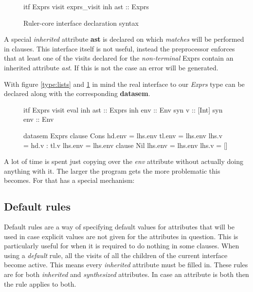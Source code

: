\begin{figure}[h!]
\begin{code}
itf Exprs
  visit exprs_visit
    inh ast :: Exprs
\end{code}
\caption{Ruler-core interface declaration syntax}
\label{itf:exprs}
\end{figure}

A special \emph{inherited} attribute \textbf{ast} is declared on which \emph{matches} will be performed in clauses. This interface itself is not useful, instead the preprocessor enforces that at least one of the visits declared for the \emph{non-terminal} Exprs contain an inherited attribute \emph{ast}. If this is not the case an error will be generated.

With figure \ref{type:lists} and \ref{itf:exprs} in mind the real interface to our \emph{Exprs} type can be declared along with the corresponding \textbf{datasem}.

\begin{figure}
\begin{minipage}[t]{0.4\linewidth}
\begin{code}
itf Exprs
  visit eval 
    inh ast  :: Exprs
    inh env  :: Env
    syn v    :: [Int]
    syn env  :: Env
\end{code}
\end{minipage}
\begin{minipage}[t]{0.6\linewidth}
\begin{code}
datasem Exprs
   clause Cons
     hd.env   = lhs.env
     tl.env   = lhs.env
     lhs.v    = hd.v : tl.v
     lhs.env  = lhs.env
   clause Nil
     lhs.env  = lhs.env
     lhs.v    = []
\end{code}
\end{minipage}
\end{figure}

A lot of time is spent just copying over the \emph{env} attribute without actually doing anything with it. The larger the program gets the more problematic this becomes. For that \rcore has a special mechanism:

\subsection{Default rules}
Default rules are a way of specifying default values for attributes that will be used in case explicit values are not given for the attributes in question. This is particularly useful for when it is required to do nothing in some clauses.
When using a \emph{default} rule, all the visits of all the children of the current interface become active. This means every \emph{inherited} attribute must be filled in.
These rules are for both \emph{inherited} and \emph{synthesized} attributes. In case an attribute is both then the rule applies to both. 

